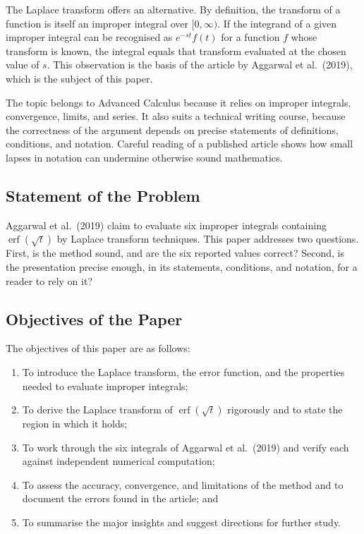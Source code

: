 \documentclass[12pt,a4paper]{article}
\theoremstyle{definition}
\theoremstyle{plain}
\theoremstyle{remark}
\newcommand{\erf}{\operatorname{erf}}
\begin{document}
	The Laplace transform offers an alternative. By definition, the transform of a function is itself an improper integral over $[0,\infty)$. If the integrand of a given improper integral can be recognised as $e^{-st}f(t)$ for a function $f$ whose transform is known, the integral equals that transform evaluated at the chosen value of $s$. This observation is the basis of the article by Aggarwal et al.\ (2019), which is the subject of this paper.
	
	The topic belongs to Advanced Calculus because it relies on improper integrals, convergence, limits, and series. It also suits a technical writing course, because the correctness of the argument depends on precise statements of definitions, conditions, and notation. Careful reading of a published article shows how small lapses in notation can undermine otherwise sound mathematics.
	
	\subsection{Statement of the Problem}
	
	Aggarwal et al.\ (2019) claim to evaluate six improper integrals containing $\erf(\sqrt{t})$ by Laplace transform techniques. This paper addresses two questions. First, is the method sound, and are the six reported values correct? Second, is the presentation precise enough, in its statements, conditions, and notation, for a reader to rely on it?
	
	\subsection{Objectives of the Paper}
	
	The objectives of this paper are as follows:
	
	\begin{enumerate}[label=\arabic*.]
		\item To introduce the Laplace transform, the error function, and the properties needed to evaluate improper integrals;
		\item To derive the Laplace transform of $\erf(\sqrt{t})$ rigorously and to state the region in which it holds;
		\item To work through the six integrals of Aggarwal et al.\ (2019) and verify each against independent numerical computation;
		\item To assess the accuracy, convergence, and limitations of the method and to document the errors found in the article; and
		\item To summarise the major insights and suggest directions for further study.
	\end{enumerate}
	
\end{document}
